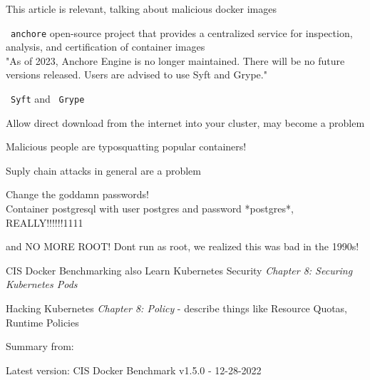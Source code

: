 \documentclass[Screen16to9,17pt]{foils}
\begin{document}
This article is relevant, talking about malicious docker images\\


\begin{list2}
\item \faWrench\ \verb+anchore+ open-source project that provides a centralized service for inspection, analysis, and certification of container images
\\
"As of 2023, Anchore Engine is no longer maintained. There will be no future versions released. Users are advised to use Syft and Grype."
\item \faWrench\ \verb+Syft+  and \faWrench\ \verb+Grype+ 
\item Allow direct download from the internet into your cluster, may become a problem
\item Malicious people are typosquatting popular containers!
\item Suply chain attacks in general are a problem
\end{list2}


\begin{list2}
\item Change the goddamn passwords!\\
Container postgresql with user postgres and password *postgres*, REALLY!!!!!!1111
\item and NO MORE ROOT! Dont run as root, we realized this was bad in the 1990s!
\item CIS Docker Benchmarking also Learn Kubernetes Security \emph{Chapter 8: Securing Kubernetes Pods}
\item Hacking Kubernetes \emph{Chapter 8: Policy} - describe things like Resource Quotas, Runtime Policies
\end{list2}


Summary from: 

\begin{list2}
\item Latest version: CIS Docker Benchmark v1.5.0 - 12-28-2022
\end{list2}
\end{document}
